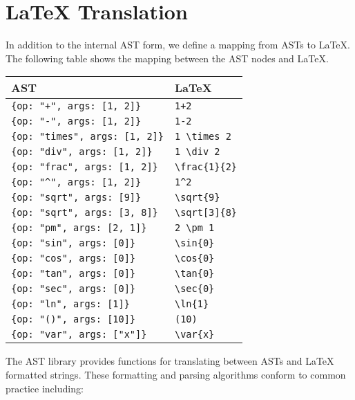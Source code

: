 \documentclass{article}
\newcommand{\var}[1]{\emph{#1}}
\begin{document}
\pagebreak

\section{LaTeX Translation}

In addition to the internal AST form, we define a mapping from ASTs to LaTeX. The following table 
shows the mapping between the AST nodes and LaTeX.

\vspace{20pt}

\begin{tabular}{ | l | l |}
\hline
{\bf AST}                           & {\bf LaTeX} \\ \hline
\verb'{op: "+", args: [1, 2]}'      & \verb'1+2' \\ \hline
\verb'{op: "-", args: [1, 2]}'      & \verb'1-2' \\ \hline
\verb'{op: "times", args: [1, 2]}'  & \verb'1 \times 2' \\ \hline
\verb'{op: "div", args: [1, 2]}'    & \verb'1 \div 2' \\ \hline
\verb'{op: "frac", args: [1, 2]}'   & \verb'\frac{1}{2}' \\ \hline
\verb'{op: "^", args: [1, 2]}'      & \verb'1^2' \\ \hline
\verb'{op: "sqrt", args: [9]}'      & \verb'\sqrt{9}' \\ \hline
\verb'{op: "sqrt", args: [3, 8]}'   & \verb'\sqrt[3]{8}' \\ \hline
\verb'{op: "pm", args: [2, 1]}'     & \verb'2 \pm 1' \\ \hline
\verb'{op: "sin", args: [0]}'       & \verb'\sin{0}' \\ \hline
\verb'{op: "cos", args: [0]}'       & \verb'\cos{0}' \\ \hline
\verb'{op: "tan", args: [0]}'       & \verb'\tan{0}' \\ \hline
\verb'{op: "sec", args: [0]}'       & \verb'\sec{0}' \\ \hline
\verb'{op: "ln", args: [1]}'        & \verb'\ln{1}' \\ \hline
\verb'{op: "()", args: [10]}'       & \verb'(10)' \\ \hline
\verb'{op: "var", args: ["x"]}'     & \verb'\var{x}' \\ \hline
\end{tabular}


\vspace{20pt}

The AST library provides functions for translating between ASTs and LaTeX formatted strings. 
These formatting and parsing algorithms conform to common practice including:
\end{document}

